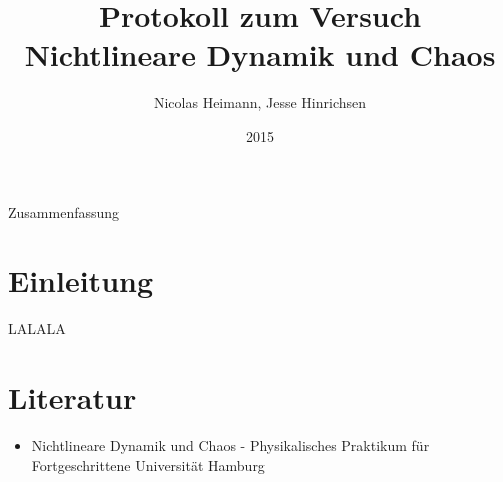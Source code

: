 \documentclass{scrartcl}
\title{Protokoll zum Versuch Nichtlineare Dynamik und Chaos}
\author{Nicolas Heimann, Jesse Hinrichsen}
\affil{\textit{Universität Hamburg}}
\date{2015}
\begin{document}
\maketitle




\begin{description}
\item Zusammenfassung
\end{description}


\section{  Einleitung  }
LALALA

\section{ Literatur }
\begin{itemize} 
\item Nichtlineare Dynamik und Chaos - Physikalisches Praktikum für Fortgeschrittene Universität Hamburg
\end{itemize}
\end{document}

